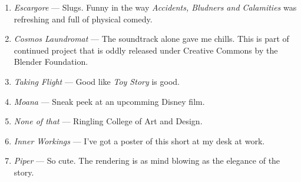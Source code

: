 \documentclass[../main.tex]{subfiles}
\begin{document}
\begin{enumerate}
	\item \textit{Escargore} --- Slugs. Funny in the way \textit{Accidents, Bludners and Calamities} was refreshing and full of physical comedy.
	\item \textit{Cosmos Laundromat} --- The soundtrack alone gave me chills. This is part of continued project that is oddly released under Creative Commons by the Blender Foundation.
	\item \textit{Taking Flight} --- Good like \textit{Toy Story} is good.
	\item \textit{Moana} --- Sneak peek at an upcomming Disney film.
	\item \textit{None of that} --- Ringling College of Art and Design.
	\item \textit{Inner Workings} --- I've got a poster of this short at my desk at work.
	\item \textit{Piper} --- So cute. The rendering is as mind blowing as the elegance of the story.
\end{enumerate}
\end{document}
